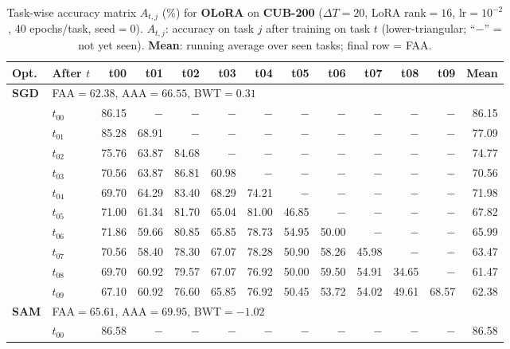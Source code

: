 \begin{table}[ht]
\centering
\caption{%
  Task-wise accuracy matrix $A_{t,j}$ (\%) for \textbf{OLoRA} on \textbf{CUB-200} ($\Delta T=20$, LoRA rank$=16$, lr$=10^{-2}$, 40 epochs/task, seed$=0$).
  $A_{t,j}$: accuracy on task $j$ after training on task $t$  (lower-triangular; ``$-$'' = not yet seen).
  \textbf{Mean}: running average over seen tasks; final row = FAA.
}
\label{tab:raw_olora_cub200}
\setlength{\tabcolsep}{2.8pt}
\renewcommand{\arraystretch}{0.88}
\scriptsize
\begin{tabular}{@{}l l r r r r r r r r r r r@{}}
\toprule
\textbf{Opt.} & \textbf{After $t$} & \textbf{t00} & \textbf{t01} & \textbf{t02} & \textbf{t03} & \textbf{t04} & \textbf{t05} & \textbf{t06} & \textbf{t07} & \textbf{t08} & \textbf{t09} & \textbf{Mean} \\
\midrule
\multirow{11}{*}{\textbf{SGD}} & \multicolumn{12}{l}{\quad\small FAA$=62.38$,\; AAA$=66.55$,\; BWT$=0.31$} \\
 & $t_{00}$ & 86.15 & $-$ & $-$ & $-$ & $-$ & $-$ & $-$ & $-$ & $-$ & $-$ & 86.15 \\
 & $t_{01}$ & 85.28 & 68.91 & $-$ & $-$ & $-$ & $-$ & $-$ & $-$ & $-$ & $-$ & 77.09 \\
 & $t_{02}$ & 75.76 & 63.87 & 84.68 & $-$ & $-$ & $-$ & $-$ & $-$ & $-$ & $-$ & 74.77 \\
 & $t_{03}$ & 70.56 & 63.87 & 86.81 & 60.98 & $-$ & $-$ & $-$ & $-$ & $-$ & $-$ & 70.56 \\
 & $t_{04}$ & 69.70 & 64.29 & 83.40 & 68.29 & 74.21 & $-$ & $-$ & $-$ & $-$ & $-$ & 71.98 \\
 & $t_{05}$ & 71.00 & 61.34 & 81.70 & 65.04 & 81.00 & 46.85 & $-$ & $-$ & $-$ & $-$ & 67.82 \\
 & $t_{06}$ & 71.86 & 59.66 & 80.85 & 65.85 & 78.73 & 54.95 & 50.00 & $-$ & $-$ & $-$ & 65.99 \\
 & $t_{07}$ & 70.56 & 58.40 & 78.30 & 67.07 & 78.28 & 50.90 & 58.26 & 45.98 & $-$ & $-$ & 63.47 \\
 & $t_{08}$ & 69.70 & 60.92 & 79.57 & 67.07 & 76.92 & 50.00 & 59.50 & 54.91 & 34.65 & $-$ & 61.47 \\
 & $t_{09}$ & 67.10 & 60.92 & 76.60 & 65.85 & 76.92 & 50.45 & 53.72 & 54.02 & 49.61 & 68.57 & 62.38 \\
\midrule
\multirow{11}{*}{\textbf{SAM}} & \multicolumn{12}{l}{\quad\small FAA$=65.61$,\; AAA$=69.95$,\; BWT$=-1.02$} \\
 & $t_{00}$ & 86.58 & $-$ & $-$ & $-$ & $-$ & $-$ & $-$ & $-$ & $-$ & $-$ & 86.58 \\

\end{tabular}
\end{table}
